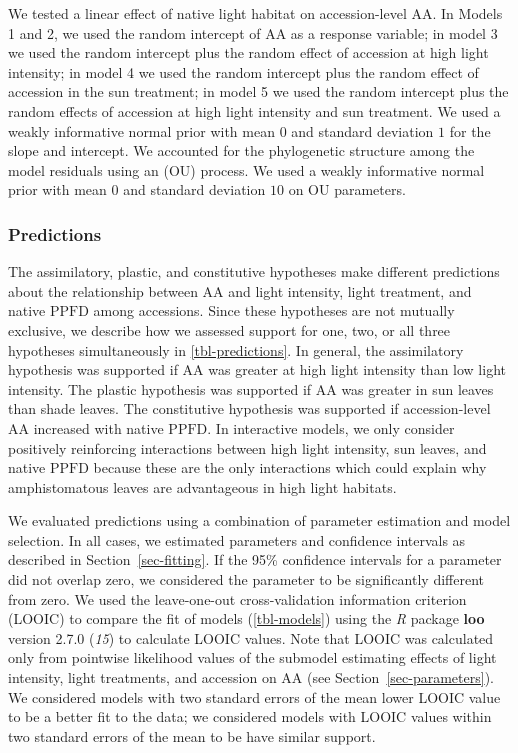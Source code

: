 \documentclass[
  letterpaper,
  DIV=11,
  numbers=noendperiod]{scrartcl}
\newcommand{\aax}{$\mathrm{AA}$}
\newcommand{\ppfd}{$\mathrm{PPFD}$}
\begin{document}
We tested a linear effect of native light habitat on accession-level
\aax. In Models 1 and 2, we used the random intercept of \aax{} as a
response variable; in model 3 we used the random intercept plus the
random effect of accession at high light intensity; in model 4 we used
the random intercept plus the random effect of accession in the sun
treatment; in model 5 we used the random intercept plus the random
effects of accession at high light intensity and sun treatment. We used
a weakly informative normal prior with mean \(0\) and standard deviation
\(1\) for the slope and intercept. We accounted for the phylogenetic
structure among the model residuals using an (OU) process. We used a
weakly informative normal prior with mean \(0\) and standard deviation
\(10\) on OU parameters.

\subsubsection{Predictions}\label{sec-predictions}

The assimilatory, plastic, and constitutive hypotheses make different
predictions about the relationship between \aax{} and light intensity,
light treatment, and native \ppfd{} among accessions. Since these
hypotheses are not mutually exclusive, we describe how we assessed
support for one, two, or all three hypotheses simultaneously in
\autoref{tbl-predictions}. In general, the assimilatory hypothesis was
supported if \aax{} was greater at high light intensity than low light
intensity. The plastic hypothesis was supported if \aax{} was greater in
sun leaves than shade leaves. The constitutive hypothesis was supported
if accession-level \aax{} increased with native \ppfd. In interactive
models, we only consider positively reinforcing interactions between
high light intensity, sun leaves, and native \ppfd{} because these are
the only interactions which could explain why amphistomatous leaves are
advantageous in high light habitats.

We evaluated predictions using a combination of parameter estimation and
model selection. In all cases, we estimated parameters and confidence
intervals as described in Section~\ref{sec-fitting}. If the 95\%
confidence intervals for a parameter did not overlap zero, we considered
the parameter to be significantly different from zero. We used the
leave-one-out cross-validation information criterion (LOOIC) to compare
the fit of models (\autoref{tbl-models}) using the \emph{R} package
\textbf{loo} version 2.7.0 (\emph{15}) to calculate LOOIC values. Note
that LOOIC was calculated only from pointwise likelihood values of the
submodel estimating effects of light intensity, light treatments, and
accession on \aax{} (see Section~\ref{sec-parameters}). We considered
models with two standard errors of the mean lower LOOIC value to be a
better fit to the data; we considered models with LOOIC values within
two standard errors of the mean to be have similar support.
\end{document}
